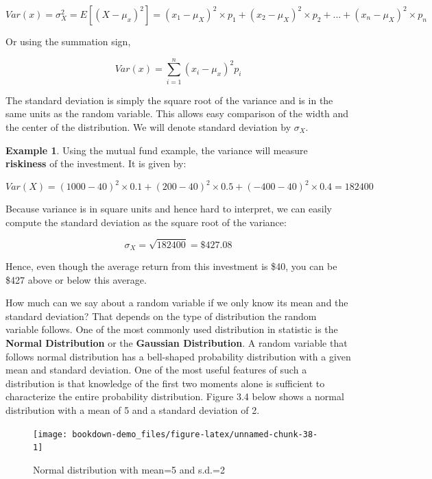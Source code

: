 \documentclass[
]{book}
\theoremstyle{definition}
\theoremstyle{definition}
\newtheorem{example}{Example}[chapter]
\theoremstyle{definition}
\theoremstyle{definition}
\theoremstyle{remark}
\begin{document}
\[Var(x)= \sigma^2_X=E[(X-\mu_x)^2]= (x_1-\mu_X)^2 \times p_1+(x_2-\mu_X)^2 \times p_2+...+ (x_n-\mu_X)^2 \times p_n\]

Or using the summation sign,

\[Var(x)=\sum_{i=1}^n (x_i-\mu_x)^2p_i\]

The standard deviation is simply the square root of the variance and is in the same units as the random variable. This allows easy comparison of the width and the center of the distribution. We will denote standard deviation by \(\sigma_X\).

\begin{example}
\protect\hypertarget{exm:unnamed-chunk-37}{}\label{exm:unnamed-chunk-37}Using the mutual fund example, the variance will measure \textbf{riskiness} of the investment. It is given by:

\[Var(X)=(1000-40)^2\times 0.1 + (200-40)^2 \times 0.5 + (-400-40)^2 \times 0.4=182400\]

Because variance is in square units and hence hard to interpret, we can easily compute the standard deviation as the square root of the variance:

\[\sigma_X=\sqrt{182400}=\$427.08\]

Hence, even though the average return from this investment is \$40, you can be \$427 above or below this average.
\end{example}

How much can we say about a random variable if we only know its mean and the standard deviation? That depends on the type of distribution the random variable follows. One of the most commonly used distribution in statistic is the \textbf{Normal Distribution} or the \textbf{Gaussian Distribution}. A random variable that follows normal distribution has a bell-shaped probability distribution with a given mean and standard deviation. One of the most useful features of such a distribution is that knowledge of the first two moments alone is sufficient to characterize the entire probability distribution. Figure 3.4 below shows a normal distribution with a mean of 5 and a standard deviation of 2.

\begin{figure}

{\centering \texttt{[image: bookdown-demo\_files/figure-latex/unnamed-chunk-38-1]} 

}

\caption{Normal distribution with mean=5 and s.d.=2}\label{fig:unnamed-chunk-38}
\end{figure}
\end{document}
